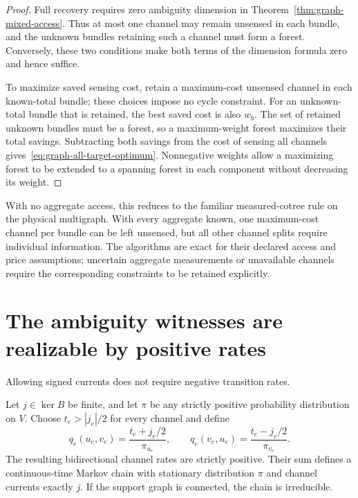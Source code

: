\begin{proof}
Full recovery requires zero ambiguity dimension in
Theorem~\ref{thm:graph-mixed-access}. Thus at most one channel may remain
unsensed in each bundle, and the unknown bundles retaining such a channel must
form a forest. Conversely, these two conditions make both terms of the
dimension formula zero and hence suffice.

To maximize saved sensing cost, retain a maximum-cost unsensed channel in
each known-total bundle; these choices impose no cycle constraint. For an
unknown-total bundle that is retained, the best saved cost is also $w_b$.
The set of retained unknown bundles must be a forest, so a maximum-weight
forest maximizes their total savings. Subtracting both savings from the cost
of sensing all channels gives~\eqref{eq:graph-all-target-optimum}. Nonnegative
weights allow a maximizing forest to be extended to a spanning forest in
each component without decreasing its weight.
\end{proof}

With no aggregate access, this reduces to the familiar measured-cotree rule
on the physical multigraph. With every aggregate known, one maximum-cost
channel per bundle can be left unsensed, but all other channel splits require
individual information. The algorithms are exact for their declared access
and price assumptions; uncertain aggregate measurements or unavailable
channels require the corresponding constraints to be retained explicitly.

\section{The ambiguity witnesses are realizable by positive rates}

Allowing signed currents does not require negative transition rates.

\begin{proposition}
\label{prop:graph-physical-realization}
Let $j\in\ker B$ be finite, and let $\pi$ be any strictly positive probability
distribution on $V$. Choose $t_e>|j_e|/2$ for every channel and define
\begin{equation}
 q_e(u_e,v_e)=\frac{t_e+j_e/2}{\pi_{u_e}},\qquad
 q_e(v_e,u_e)=\frac{t_e-j_e/2}{\pi_{v_e}}.
 \label{eq:graph-rate-realization}
\end{equation}
The resulting bidirectional channel rates are strictly positive. Their sum
defines a continuous-time Markov chain with stationary distribution $\pi$ and
channel currents exactly $j$. If the support graph is connected, the chain is
irreducible.
\end{proposition}

